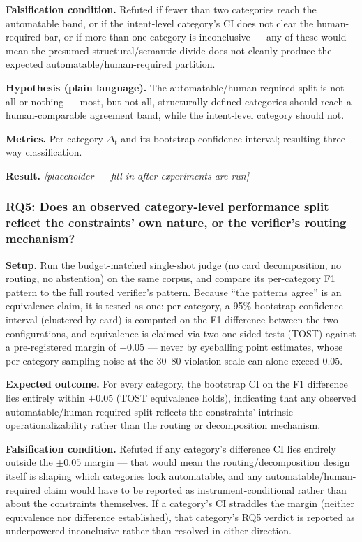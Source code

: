 \documentclass[11pt]{article}
\newcommand{\ph}{\textit{[placeholder --- fill in after experiments are run]}}
\begin{document}
\textbf{Falsification condition.} Refuted if fewer than two categories reach the automatable band, or if the intent-level category's CI does not clear the human-required bar, or if more than one category is inconclusive --- any of these would mean the presumed structural/semantic divide does not cleanly produce the expected automatable/human-required partition.

\textbf{Hypothesis (plain language).} The automatable/human-required split is not all-or-nothing --- most, but not all, structurally-defined categories should reach a human-comparable agreement band, while the intent-level category should not.

\textbf{Metrics.} Per-category $\Delta_t$ and its bootstrap confidence interval; resulting three-way classification.

\textbf{Result.} \ph

\subsubsection{RQ5: Does an observed category-level performance split reflect the constraints' own nature, or the verifier's routing mechanism?}
\textbf{Setup.} Run the budget-matched single-shot judge (no card decomposition, no routing, no abstention) on the same corpus, and compare its per-category F1 pattern to the full routed verifier's pattern. Because ``the patterns agree'' is an equivalence claim, it is tested as one: per category, a 95\% bootstrap confidence interval (clustered by card) is computed on the F1 difference between the two configurations, and equivalence is claimed via two one-sided tests (TOST) against a pre-registered margin of $\pm 0.05$ --- never by eyeballing point estimates, whose per-category sampling noise at the 30--80-violation scale can alone exceed 0.05.

\textbf{Expected outcome.} For every category, the bootstrap CI on the F1 difference lies entirely within $\pm 0.05$ (TOST equivalence holds), indicating that any observed automatable/human-required split reflects the constraints' intrinsic operationalizability rather than the routing or decomposition mechanism.

\textbf{Falsification condition.} Refuted if any category's difference CI lies entirely outside the $\pm 0.05$ margin --- that would mean the routing/decomposition design itself is shaping which categories look automatable, and any automatable/human-required claim would have to be reported as instrument-conditional rather than about the constraints themselves. If a category's CI straddles the margin (neither equivalence nor difference established), that category's RQ5 verdict is reported as underpowered-inconclusive rather than resolved in either direction.
\end{document}
